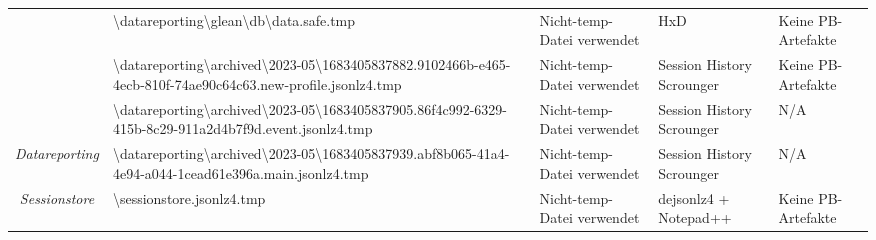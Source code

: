 \begin{appendices}
{\begin{landscape}
\begin{table}[h!]
{\begin{tabular}{cllll}
	\multicolumn{1}{|c|}{}                                                                                       & \multicolumn{1}{l|}{\cellcolor[HTML]{3190FF}\textbackslash{}datareporting\textbackslash{}glean\textbackslash{}db\textbackslash{}data.safe.tmp}                                                                      & \multicolumn{1}{l|}{\cellcolor[HTML]{FCFF2F}Nicht-temp-Datei verwendet}                           & \multicolumn{1}{l|}{HxD}                         & \multicolumn{1}{l|}{\cellcolor[HTML]{F8A102}Keine PB-Artefakte} \\ \cline{2-5} 
	\multicolumn{1}{|c|}{}                                                                                       & \multicolumn{1}{l|}{\cellcolor[HTML]{3190FF}\textbackslash{}datareporting\textbackslash{}archived\textbackslash{}2023-05\textbackslash{}1683405837882.9102466b-e465-4ecb-810f-74ae90c64c63.new-profile.jsonlz4.tmp} & \multicolumn{1}{l|}{\cellcolor[HTML]{FCFF2F}Nicht-temp-Datei verwendet}                           & \multicolumn{1}{l|}{Session History Scrounger}   & \multicolumn{1}{l|}{\cellcolor[HTML]{F8A102}Keine PB-Artefakte} \\ \cline{2-5} 
	\multicolumn{1}{|c|}{}                                                                                       & \multicolumn{1}{l|}{\cellcolor[HTML]{3190FF}\textbackslash{}datareporting\textbackslash{}archived\textbackslash{}2023-05\textbackslash{}1683405837905.86f4c992-6329-415b-8c29-911a2d4b7f9d.event.jsonlz4.tmp}       & \multicolumn{1}{l|}{\cellcolor[HTML]{FCFF2F}Nicht-temp-Datei verwendet}                           & \multicolumn{1}{l|}{Session History Scrounger}   & \multicolumn{1}{l|}{\cellcolor[HTML]{C0C0C0}N/A}                \\ \cline{2-5} 
	\multicolumn{1}{|c|}{\multirow{-4}{*}{\textit{Datareporting}}}                                               & \multicolumn{1}{l|}{\cellcolor[HTML]{3190FF}\textbackslash{}datareporting\textbackslash{}archived\textbackslash{}2023-05\textbackslash{}1683405837939.abf8b065-41a4-4e94-a044-1cead61e396a.main.jsonlz4.tmp}        & \multicolumn{1}{l|}{\cellcolor[HTML]{FCFF2F}Nicht-temp-Datei verwendet}                           & \multicolumn{1}{l|}{Session History Scrounger}   & \multicolumn{1}{l|}{\cellcolor[HTML]{C0C0C0}N/A}                \\ \hline
	\multicolumn{1}{|c|}{\textit{Sessionstore}}                                                                  & \multicolumn{1}{l|}{\cellcolor[HTML]{3190FF}\textbackslash{}sessionstore.jsonlz4.tmp}                                                                                                                               & \multicolumn{1}{l|}{\cellcolor[HTML]{FCFF2F}Nicht-temp-Datei verwendet}                           & \multicolumn{1}{l|}{dejsonlz4 + Notepad++}       & \multicolumn{1}{l|}{\cellcolor[HTML]{F8A102}Keine PB-Artefakte} \\ \hline

\end{tabular}}
\end{table}
\end{landscape}}
\end{appendices}
